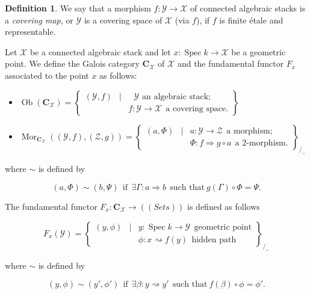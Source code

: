 \documentclass{amsart}
\theoremstyle{definition}
\newtheorem{defn}[thm]{Definition}
\theoremstyle{remark}
\theoremstyle{remark}
\newcommand{\X}{\mathcal{X}}
\newcommand{\Y}{\mathcal{Y}}
\newcommand{\Z}{\mathcal{Z}}
\newcommand{\Ra}{\Rightarrow}
\newcommand{\rsa}{\rightsquigarrow}
\let\:=\colon
\newcommand{\Spec}{\operatorname{Spec}}
\newcommand{\Ob}{\operatorname{Ob}}
\newcommand{\Mor}{\operatorname{Mor}}
\begin{document}
\begin{defn}{\label{D:covering}}
We say that a morphism $f \: \Y \to \X$ of connected algebraic
stacks is a {\em covering map}, or $\Y$ is a covering space of
$\X$ (via $f$), if $f$ is finite \'{e}tale and representable.
\end{defn}

Let $\X$ be a connected algebraic stack and let $x \: \Spec k \to
\X$ be a geometric point. We define the Galois category
$\mathbf{C}_{\X}$ of $\X$ and the fundamental functor $F_x$
associated to the point $x$ as follows:

\begin{itemize}
\item  $\Ob (\mathbf{C}_{\X}) = \left\{ \begin{array}{rcl}
         (\Y, f)   & \vert & \text{ $\Y$ \ an  algebraic stack;} \\
            & &  f \: \Y \to \X \ \  \text{a covering space.}
                                      \end{array} \right\}$

\item  $\Mor_{\mathbf{C}_{\X}}((\Y,f), (\Z,g))=\left\{\begin{array}{rcl}
           (a,\Phi) & \vert & a \: \Y \to \Z \  \ \text{a morphism;} \\
        && \Phi \: f \Ra g \circ a \  \ \text{a 2-morphism.} \end{array}\right\}_{/_\sim}$
\end{itemize}

\noindent where $\sim$ is defined by

$$(a, \Phi) \sim (b, \Psi) \ \ \text{if}\ \  \exists \Gamma  \: a
\Ra b \ \ \text{such that} \  g(\Gamma) \circ \Phi = \Psi.$$

\vspace{.2in}

\noindent The fundamental functor $F_x \: \mathbf{C}_{\X} \to
((Sets))$ is defined as follows

$$F_x(\Y)= \left\{\begin{array}{rcl} (y, \phi) & \vert & y \:
\Spec k \to \Y
                                                    \ \ \text{geometric point} \\
  & & \phi \: x \rsa f(y) \ \ \text{hidden path} \end{array} \right\}_{/_\sim}$$

\noindent where $\sim$ is defined by

$$(y, \phi) \sim (y',\phi') \ \ \text{if}\ \  \exists \beta \: y
\rsa y' \ \ \text{such that} \ f(\beta) \circ \phi =\phi'.$$
\end{document}

